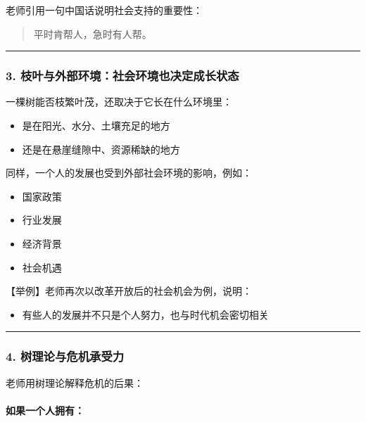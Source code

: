 \documentclass[
  chinese,
  9pt,
  a4paper,
]{ctexart}
\providecommand{\tightlist}{%
  \setlength{\itemsep}{0pt}\setlength{\parskip}{0pt}}
\begin{document}
老师引用一句中国话说明社会支持的重要性：

\begin{quote}
平时肯帮人，急时有人帮。
\end{quote}

\begin{center}\rule{0.5\linewidth}{0.5pt}\end{center}

\subsubsection{3.
枝叶与外部环境：社会环境也决定成长状态}\label{ux679dux53f6ux4e0eux5916ux90e8ux73afux5883ux793eux4f1aux73afux5883ux4e5fux51b3ux5b9aux6210ux957fux72b6ux6001}

一棵树能否枝繁叶茂，还取决于它长在什么环境里：

\begin{itemize}
\tightlist
\item
  是在阳光、水分、土壤充足的地方
\item
  还是在悬崖缝隙中、资源稀缺的地方
\end{itemize}

同样，一个人的发展也受到外部社会环境的影响，例如：

\begin{itemize}
\tightlist
\item
  国家政策
\item
  行业发展
\item
  经济背景
\item
  社会机遇
\end{itemize}

【举例】老师再次以改革开放后的社会机会为例，说明：

\begin{itemize}
\tightlist
\item
  有些人的发展并不只是个人努力，也与时代机会密切相关
\end{itemize}

\begin{center}\rule{0.5\linewidth}{0.5pt}\end{center}

\subsubsection{4.
树理论与危机承受力}\label{ux6811ux7406ux8bbaux4e0eux5371ux673aux627fux53d7ux529b}

老师用树理论解释危机的后果：

\paragraph{如果一个人拥有：}\label{ux5982ux679cux4e00ux4e2aux4ebaux62e5ux6709}
\end{document}
